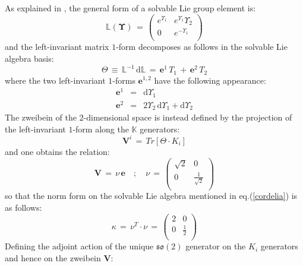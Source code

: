 \documentclass[10pt,a4paper]{article}
\newcommand{\so}{\mathfrak{so}}
\begin{document}
 As explained in \cite{pgtstheory}, the general form of a solvable Lie group element is:
 \begin{equation}\label{trullo}
   \mathbb{L}(\boldsymbol{\Upsilon}) \,= \, \left(
\begin{array}{cc}
 e^{\Upsilon _1} & e^{\Upsilon _1} \Upsilon _2 \\
 0 & e^{-\Upsilon _1} \\
\end{array}
\right)
 \end{equation}
and the left-invariant matrix $1$-form decomposes as follows in the solvable Lie algebra basis:
 \begin{equation}\label{invarform}
   \Theta \, \equiv \, \mathbb{L}^{-1}\, \mathrm{d}\mathbb{L} \, = \, \mathbf{e}^1 \, T_1 \, + \, \mathbf{e}^2 \,  T_2
 \end{equation}
where the two left-invariant $1$-forms $\mathbf{e}^{1,2}$ have the following appearance:
\begin{eqnarray}\label{epissili}
   \mathbf{e}^1 &=& \text{d$\Upsilon $}_1\nonumber\\
   \mathbf{e}^2&=& 2 \Upsilon_ 2 \,\text{d$\Upsilon $}_1 +\text{d$\Upsilon
   $}_2
\end{eqnarray}
The zweibein of the $2$-dimensional space is instead defined by the projection of the left-invariant $1$-form along the $\mathbb{K}$ generators:
\begin{equation}\label{kurchatov}
  \mathbf{V}^i \, = \, Tr[\Theta\cdot K_i]
\end{equation}
and one obtains the relation:
\begin{equation}\label{krumito}
     \mathbf{V} \, = \, \nu \, \mathbf{e} \quad ; \quad \nu \, = \, \left(
\begin{array}{cc}
 \sqrt{2} & 0 \\
 0 & \frac{1}{\sqrt{2}} \\
\end{array}
\right)
\end{equation}
so that the norm form on the solvable Lie algebra mentioned in eq.(\ref{cordelia}) is as follows:
\begin{equation}\label{corneliogracco}
   \kappa \, = \, \nu^T\cdot\nu \, = \, \left(
\begin{array}{cc}
 2 & 0 \\
 0 & \frac{1}{2} \\
\end{array}
\right)
\end{equation}
 Defining the adjoint action of the unique $\so(2)$ generator on the $K_i$ generators and hence on the zweibein $\mathbf{V}$:
\end{document}
